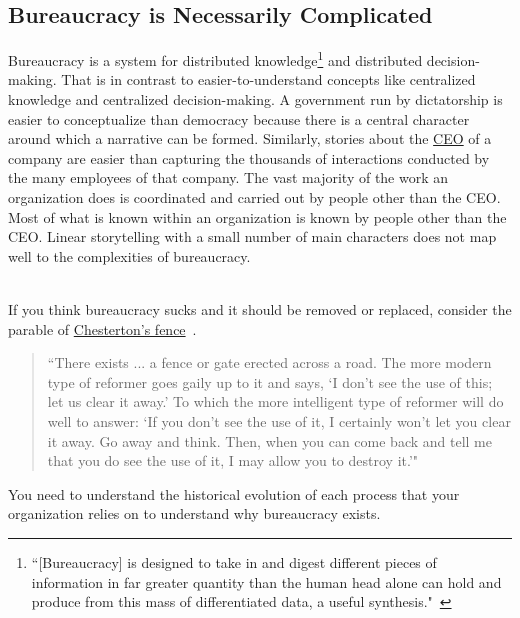 \subsection*{Bureaucracy is Necessarily Complicated}

Bureaucracy is a system for distributed knowledge\footnote{``[Bureaucracy] is designed to take in and digest different pieces of information in far greater quantity than the human head alone can hold and produce from this mass of differentiated data, a useful synthesis."~\cite{1966_Morison}} 
and distributed decision-making. 
That is in contrast to easier-to-understand concepts like centralized knowledge and centralized decision-making. A government run by dictatorship is easier to conceptualize than democracy because there is a central character around which a narrative can be formed. Similarly, stories about the \href{https://en.wikipedia.org/wiki/Chief_executive_officer}{CEO} 
%
\iftoggle{WPinmargin}{\marginpar{$>$Wikipedia: Chief executive officer}}{}
of a company are easier than capturing the thousands of interactions conducted by the many employees of that company. The vast majority of the work an organization does is coordinated and carried out by people other than the CEO. Most of what is known within an organization is known by people other than the CEO. Linear storytelling with a small number of main characters does not map well to the complexities of bureaucracy. 

\ \\

If you think bureaucracy sucks and it should be removed or replaced,  consider the parable of 
\href{https://en.wikipedia.org/wiki/G._K._Chesterton\%23Chesterton\%27s_fence}{Chesterton's fence}~\cite{1929_Chesterton}. 
\label{concept:chestertons_fence}
\iftoggle{WPinmargin}{\marginpar{$>$Wikipedia: Chesterton's fence}}{}
\begin{quote}
``There exists ... a fence or gate erected across a road. The more modern type of reformer goes gaily up to it and says, `I don't see the use of this; let us clear it away.' To which the more intelligent type of reformer will do well to answer: `If you don't see the use of it, I certainly won't let you clear it away. Go away and think. Then, when you can come back and tell me that you do see the use of it, I may allow you to destroy it.'"
\end{quote}
You need to understand the historical evolution of each process that your organization relies on to understand why bureaucracy exists.

